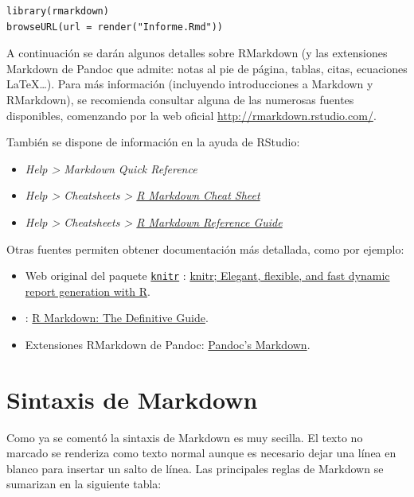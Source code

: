 \documentclass[
]{book}
\theoremstyle{break}
\theoremstyle{nonumberplain}
\begin{document}
\begin{verbatim}
library(rmarkdown)
browseURL(url = render("Informe.Rmd"))
\end{verbatim}

A continuación se darán algunos detalles sobre RMarkdown (y las extensiones Markdown de Pandoc que admite: notas al pie de página, tablas, citas, ecuaciones LaTeX\ldots).
Para más información (incluyendo introducciones a Markdown y RMarkdown), se recomienda consultar alguna de las numerosas fuentes disponibles, comenzando por la web oficial \url{http://rmarkdown.rstudio.com/}.

También se dispone de información en la ayuda de RStudio:

\begin{itemize}
\item
  \emph{Help \textgreater{} Markdown Quick Reference}
\item
  \emph{Help \textgreater{} Cheatsheets \textgreater{} \href{https://www.rstudio.org/links/r_markdown_cheat_sheet}{R Markdown Cheat Sheet}}
\item
  \emph{Help \textgreater{} Cheatsheets \textgreater{} \href{https://www.rstudio.com/wp-content/uploads/2015/03/rmarkdown-reference.pdf}{R Markdown Reference Guide}}
\end{itemize}

Otras fuentes permiten obtener documentación más detallada, como por ejemplo:

\begin{itemize}
\item
  Web original del paquete \href{https://yihui.org/knitr/}{\texttt{knitr}} \citep{R-knitr}: \href{https://yihui.name/knitr}{knitr; Elegant, flexible, and fast dynamic report generation with R}.
\item
  \citet{xie2018r} : \href{https://bookdown.org/yihui/rmarkdown}{R Markdown: The Definitive Guide}.
\item
  Extensiones RMarkdown de Pandoc: \href{https://rmarkdown.rstudio.com/authoring_pandoc_markdown.html\%23raw-tex}{Pandoc's Markdown}.
\end{itemize}

\hypertarget{markdown}{%
\section{Sintaxis de Markdown}\label{markdown}}

Como ya se comentó la sintaxis de Markdown es muy secilla.
El texto no marcado se renderiza como texto normal aunque es necesario dejar una línea en blanco para insertar un salto de línea.
Las principales reglas de Markdown se sumarizan en la siguiente tabla:
\end{document}
